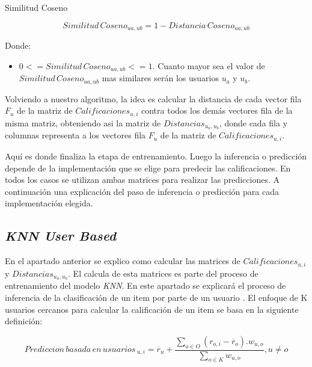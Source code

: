 \documentclass[11pt,a4paper,twoside]{thesis}
\begin{document}
\clearpage
\begin{description}
	\item[Similitud Coseno]
\end{description}
\begin{equation}
	Similitud \mspace{3mu}Coseno_{ua, ub} = 1- Distancia \mspace{3mu}Coseno_{ua, ub}
\end{equation}
\begin{description}
	\item[Donde:]
\end{description}
\begin{itemize}
	\item $0 <= Similitud \mspace{3mu}Coseno_{ua, ub} <= 1$. Cuanto mayor sea el valor de $Similitud \mspace{3mu}Coseno_{ua, ub}$ mas similares serán los usuarios $u_a$ y $u_b$.
\end{itemize}


Volviendo a nuestro algoritmo, la idea es calcular la distancia de cada vector fila $F_u$ de la matriz de $Calificaciones_{u,i}$ contra todos los demás vectores fila de la misma matriz, obteniendo asi la matriz de $Distancias_{u_a,u_b}$, donde cada fila y columnas representa a los vectores fila $F_u$ de la matriz de $Calificaciones_{u,i}$. 

Aquí es donde finaliza la etapa de entrenamiento. Luego la inferencia o predicción depende de la implementación que se elige para predecir las calificaciones. En todos los casos se utilizan ambas matrices para realizar las predicciones. A continuación una explicación del paso de inferencia o predicción para cada implementación elegida.

\clearpage

\subsection{\textit{KNN User Based}}

En el apartado anterior se explico como calcular las matrices de $Calificaciones_{u,i}$ y $Distancias_{u_a,u_b}$. El calcula de esta matrices es parte del proceso de entrenamiento del modelo \textit{KNN}. En este apartado se explicará el proceso de inferencia de la clasificación de un item por parte de un usuario \cite{useritembasedinference}. El enfoque de K usuarios cercanos para calcular la calificación de un item se basa en la siguiente definición:

\begin{equation}
	Prediccion \mspace{3mu}basada \mspace{3mu}en \mspace{3mu}usuarios\mspace{3mu}_{u, i} = \overline{r}_{u} + \frac{\sum_{o \in O} (r_{o, i} - \overline{r}_o) . w_{u, o} }{ \sum_{o \in K} w_{u, o}}, u \neq o
\end{equation}
\end{document}
